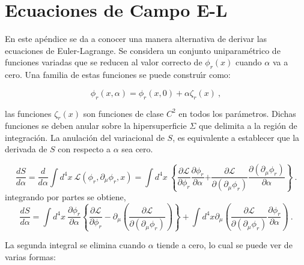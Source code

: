 \label{Apendice B}

\chapter{Ecuaciones de Campo E-L}

En este apéndice se da a conocer una manera alternativa de derivar las ecuaciones de Euler-Lagrange.
Se considera un conjunto uniparam\'{e}trico de funciones variadas que se reducen al valor correcto de $\phi
_{r}\left( x \right) $ cuando $\alpha $ va a cero. Una familia de estas funciones se puede constru\'{\i}r como:

\begin{equation*}
\phi_{r}\left( x,\alpha \right) =\phi_{r}\left( x,0\right) +\alpha \zeta _{r}\left( x\right) ~,
\end{equation*}

las funciones $\zeta_{r}\left(x\right)$ son funciones de clase $C^{2}$ en todos los par\'{a}metros. Dichas funciones se deben anular sobre la hipersuperficie $\Sigma$ que delimita a la regi\'{o}n de integraci\'{o}n. La anulaci\'{o}n del variacional de $S$, es equivalente a establecer
que la derivada de $S$ con respecto a $\alpha $ sea cero.

\begin{equation}
\frac{dS}{d\alpha }=\frac{d}{d\alpha }\int d^{4}x\ \mathcal{L}\left(\phi_{r},\partial_{\mu }\phi_{r},x\right) =\int d^{4}x\
\left\{ \frac{\partial \mathcal{L}}{\partial \phi_{r}}\frac{\partial \phi _{r}}{\partial \alpha }\mathcal{+}\frac{\partial \mathcal{L}}{\partial \left( \partial _{\mu }\phi_{r}\right) }\frac{\partial \left(\partial _{\mu }\phi _{r}\right) }{\partial \alpha }\right\} ~.
\label{2.19}
\end{equation}
integrando por partes se obtiene,
\begin{equation}
\frac{dS}{d\alpha }=\int d^{4}x\ \frac{\partial \phi_{r}}{\partial \alpha }\left\{ \frac{\partial \mathcal{L}}{\partial \phi_{r}}-\partial
_{\mu}\left( \frac{\partial \mathcal{L}}{\partial \left( \partial _{\mu }\phi_{r}\right) }\right) \right\} +\int d^{4}x\partial_{\mu}\left(\frac{\partial \mathcal{L}}{\partial \left( \partial _{\mu }\phi_{r}\right) }\frac{\partial \phi_{r}}{\partial \alpha }\right)
~.  \label{2.19a}
\end{equation}

La segunda integral se elimina cuando $\alpha $ tiende a cero, lo cual se
puede ver de varias formas:
\vspace{0.5cm}

